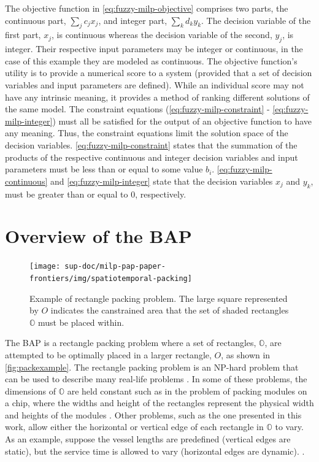 \documentclass[ee,thesis]{usuthesis}
\begin{document}
The objective function in \ref{eq:fuzzy-milp-objective} comprises two parts, the continuous part, \(\sum_j c_j x_j\), and
integer part, \(\sum_k d_k y_k\). The decision variable of the first part, \(x_j\), is continuous whereas the decision variable
of the second, \(y_j\), is integer. Their respective input parameters may be integer or continuous, in the case of this
example they are modeled as continuous. The objective function's utility is to provide a numerical score to a system
(provided that a set of decision variables and input parameters are defined). While an individual score may not have any
intrinsic meaning, it provides a method of ranking different solutions of the same model. The constraint equations
(\ref{eq:fuzzy-milp-constraint} - \ref{eq:fuzzy-milp-integer}) must all be satisfied for the output of an objective
function to have any meaning. Thus, the constraint equations limit the solution space of the decision variables.
\ref{eq:fuzzy-milp-constraint} states that the summation of the products of the respective continuous and integer
decision variables and input parameters must be less than or equal to some value \(b_i\). \ref{eq:fuzzy-milp-continuous}
and \ref{eq:fuzzy-milp-integer} state that the decision variables \(x_j\) and \(y_k\), must be greater than or equal to 0,
respectively.

\section{Overview of the BAP}
\label{sec:overview-of-the-bap}
\begin{figure}
  \centering
  \texttt{[image: sup-doc/milp-pap-paper-frontiers/img/spatiotemporal-packing]}
  \caption{Example of rectangle packing problem. The large square represented by $O$ indicates the canstrained area that the set of shaded rectangles $\mathbb{O}$ must be placed within.}
  \label{fig:packexample}
\end{figure}

The BAP is a rectangle packing problem where a set of rectangles, \(\mathbb{O}\), are attempted to be optimally placed in
a larger rectangle, \(O\), as shown in \autoref{fig:packexample}. The rectangle packing problem is an NP-hard problem that
can be used to describe many real-life problems \cite{bruin-2013-rectan-packin,murata-1995-rectan}. In some of these
problems, the dimensions of \(\mathbb{O}\) are held constant such as in the problem of packing modules on a chip, where
the widths and height of the rectangles represent the physical width and heights of the modules
\cite{murata-1995-rectan}. Other problems, such as the one presented in this work, allow either the horizontal or
vertical edge of each rectangle in \(\mathbb{O}\) to vary. As an example, suppose the vessel lengths are predefined
(vertical edges are static), but the service time is allowed to vary (horizontal edges are dynamic).
\cite{buhrkal-2011-model-discr}.
\end{document}
